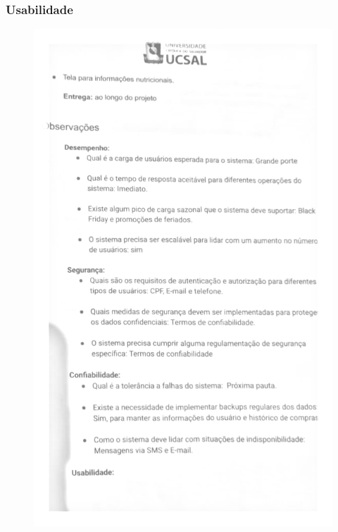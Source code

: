\documentclass[12pt,oneside,a4paper,article]{abntex2}
\begin{document}
  \subsubsection{Usabilidade}
    \begin{figure}[H]
        \centering
        \includegraphics[width=0.75\linewidth]{imagens-template/Entrevista1/Observações.png}
        \label{fig:placeholder}
    \end{figure}
    
\end{document}
